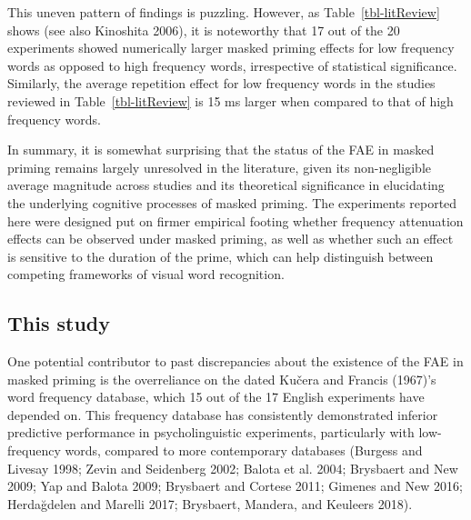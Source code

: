 \documentclass[
]{interact}
\begin{document}
This uneven pattern of findings is puzzling. However, as
Table~\ref{tbl-litReview} shows (see also Kinoshita 2006), it is
noteworthy that 17 out of the 20 experiments showed numerically larger
masked priming effects for low frequency words as opposed to high
frequency words, irrespective of statistical significance. Similarly,
the average repetition effect for low frequency words in the studies
reviewed in Table~\ref{tbl-litReview} is 15 ms larger when compared to
that of high frequency words.

In summary, it is somewhat surprising that the status of the FAE in
masked priming remains largely unresolved in the literature, given its
non-negligible average magnitude across studies and its theoretical
significance in elucidating the underlying cognitive processes of masked
priming. The experiments reported here were designed put on firmer
empirical footing whether frequency attenuation effects can be observed
under masked priming, as well as whether such an effect is sensitive to
the duration of the prime, which can help distinguish between competing
frameworks of visual word recognition.

\subsection{This study}\label{this-study}

One potential contributor to past discrepancies about the existence of
the FAE in masked priming is the overreliance on the dated Kučera and
Francis (1967)'s word frequency database, which 15 out of the 17 English
experiments have depended on. This frequency database has consistently
demonstrated inferior predictive performance in psycholinguistic
experiments, particularly with low-frequency words, compared to more
contemporary databases (Burgess and Livesay 1998; Zevin and Seidenberg
2002; Balota et al. 2004; Brysbaert and New 2009; Yap and Balota 2009;
Brysbaert and Cortese 2011; Gimenes and New 2016; Herdağdelen and
Marelli 2017; Brysbaert, Mandera, and Keuleers 2018).
\end{document}
